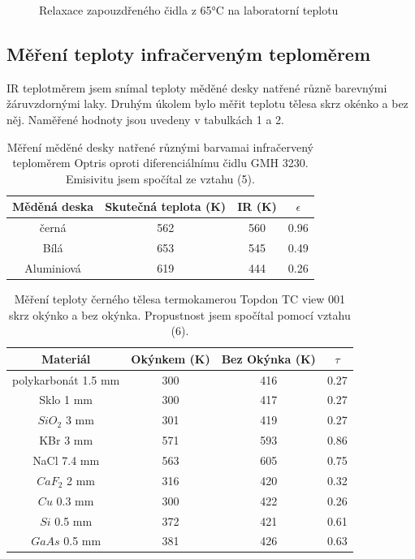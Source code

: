 \documentclass[a4paper,11pt]{article}
\begin{document}
\begin{figure}[ht]
  \centering
  
  \caption{Relaxace zapouzdřeného čidla z 65°C na laboratorní teplotu}
\end{figure}

\subsection{Měření teploty infračerveným teploměrem}

IR teplotměrem jsem snímal teploty měděné desky natřené různě barevnými žáruvzdornými laky. 
Druhým úkolem bylo měřit teplotu tělesa skrz okénko a bez něj. Naměřené hodnoty jsou uvedeny v tabulkách 1 a 2.

\begin{table}[ht]
  \centering
  \begin{tabular}{ | c | c | c | c | }
    \hline
    Měděná deska & Skutečná teplota (K) & IR (K) & $\epsilon$ \\ \hline
    černá & 562 & 560 & 0.96 \\
    Bílá & 653 & 545 & 0.49 \\
    Aluminiová & 619 & 444 & 0.26 \\ \hline
  \end{tabular}
  \captionsetup{justification=centering}
  \caption{Měření měděné desky natřené různými barvamai infračervený teploměrem Optris oproti diferenciálnímu čidlu GMH 3230. 
  Emisivitu jsem spočítal ze vztahu (5).}
\end{table}

\begin{table}[ht]
  \centering
  \begin{tabular}{| c | c | c | c | }
    \hline
    Materiál & Okýnkem (K) & Bez Okýnka (K) & $\tau$ \\ \hline
    polykarbonát 1.5 mm & 300 & 416 & 0.27 \\
    Sklo 1 mm & 300 & 417 & 0.27  \\ 
    $SiO_2$ 3 mm & 301 & 419 & 0.27 \\ 
    KBr 3 mm& 571 & 593 & 0.86 \\
    NaCl 7.4 mm & 563 & 605 & 0.75\\
    $CaF_2$ 2 mm & 316 & 420 & 0.32 \\ 
    $Cu$ 0.3 mm & 300 & 422 & 0.26 \\ 
    $Si$ 0.5 mm & 372 & 421 & 0.61 \\ 
    $GaAs$ 0.5 mm & 381 & 426 & 0.63 \\ \hline
  \end{tabular}
  \captionsetup{justification=centering}
  \caption{Měření teploty černého tělesa termokamerou Topdon TC view 001 skrz okýnko a bez okýnka. Propustnost jsem spočítal pomocí vztahu (6).}
\end{table}
\end{document}
